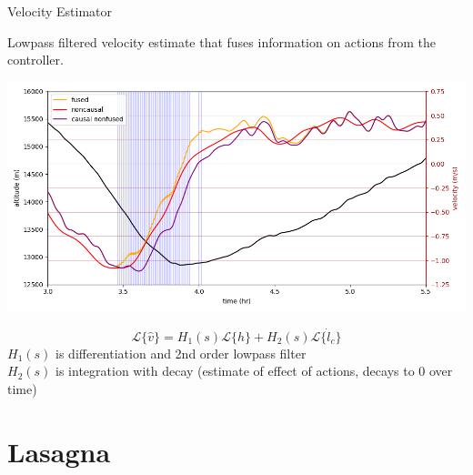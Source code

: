 \documentclass[10pt,mathserif]{beamer}
\begin{document}
\begin{frame}{Velocity Estimator}

Lowpass filtered velocity estimate that fuses information on actions from the controller.
\begin{center}
\includegraphics[width=.8\linewidth,trim={10 0 10 0cm},clip]{est.png}
\end{center}
\vspace{-0.5cm}
\[ \mathcal{L}\{ \hat v \} = H_1(s) \mathcal{L}\{h\} + H_2(s) \mathcal{L} \{\dot l_c\} \]
$H_1(s)$ is differentiation and 2nd order lowpass filter\\
$H_2(s)$ is integration with decay (estimate of effect of actions, decays to 0 over time)
\end{frame}


\section{Lasagna}
\end{document}
